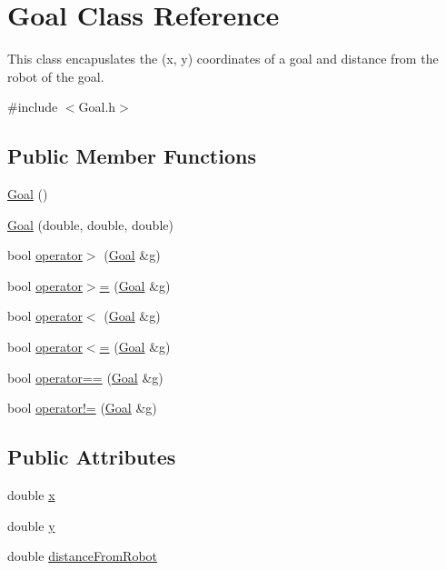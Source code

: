 \hypertarget{classGoal}{\section{\-Goal \-Class \-Reference}
\label{classGoal}
}


\-This class encapuslates the (x, y) coordinates of a goal and distance from the robot of the goal.  




{\ttfamily \#include $<$\-Goal.\-h$>$}

\subsection*{\-Public \-Member \-Functions}
\begin{DoxyCompactItemize}
\item 
\hyperlink{classGoal_aef5013c9bf548e51178f58da869d508a}{\-Goal} ()
\item 
\hyperlink{classGoal_a190d96445b05712e4f7449fb7621a4cf}{\-Goal} (double, double, double)
\item 
bool \hyperlink{classGoal_a5379ce3cef229c206bda73319a524b6d}{operator$>$} (\hyperlink{classGoal}{\-Goal} \&g)
\item 
bool \hyperlink{classGoal_abdfff0d10f040e8b913c3ccc0e243d30}{operator$>$=} (\hyperlink{classGoal}{\-Goal} \&g)
\item 
bool \hyperlink{classGoal_a7b24e6fb2bc63837c7b9d06bacc12c92}{operator$<$} (\hyperlink{classGoal}{\-Goal} \&g)
\item 
bool \hyperlink{classGoal_a560a053fd4c5ba5a736bc2c6d6b90851}{operator$<$=} (\hyperlink{classGoal}{\-Goal} \&g)
\item 
bool \hyperlink{classGoal_ada8043a85c61dd68833acdddb4b3cce8}{operator==} (\hyperlink{classGoal}{\-Goal} \&g)
\item 
bool \hyperlink{classGoal_a6e759f1dd1654bbdb779427b63b0a8ac}{operator!=} (\hyperlink{classGoal}{\-Goal} \&g)
\end{DoxyCompactItemize}
\subsection*{\-Public \-Attributes}
\begin{DoxyCompactItemize}
\item 
double \hyperlink{classGoal_af6cd641b328568cc900da4bcc25a9a7a}{x}
\item 
double \hyperlink{classGoal_a12a0a145556d1f773e12a91a4c8ca36d}{y}
\item 
double \hyperlink{classGoal_a5b81dbab33309729a8f8ebc60deb9a15}{distance\-From\-Robot}
\end{DoxyCompactItemize}
